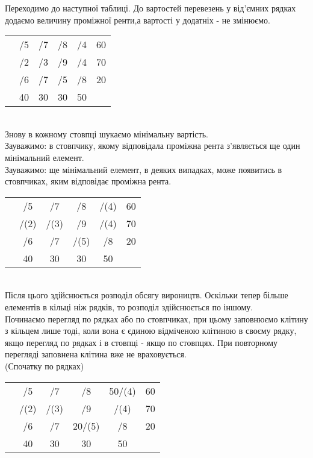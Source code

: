 \documentclass[12pt,a4paper]{book}
\begin{document}
Переходимо до наступної таблиці. До вартостей перевезень у від’ємних рядках додаємо величину проміжної ренти,а вартості у додатніх - не змінюємо.\\
\begin{tabular}{ | c | c | c | c | c | c | }
\hline
	&		&		&		&		&\\
\hline
	&	/5	&	/7	&	/8	&	/4	&	60\\
\hline
	&	/2	&	/3	&	/9	&	/4	&	70\\
\hline
	&	/6	&	/7	&	/5	&	/8	&	20\\
\hline
	&	40	&	30	&	30	&	50	&\\
\hline
\end{tabular}\\
Знову в кожному стовпці шукаємо мінімальну вартість.\\
Зауважимо: в стовпчику, якому відповідала проміжна рента з’являється ще один мінімальний елемент.\\
Зауважимо: ще мінімальний елемент, в деяких випадках, може появитись в стовпчиках, яким відповідає проміжна рента.\\
\begin{tabular}{ | c | c | c | c | c | c | }
\hline
	&		&		&		&		&\\
\hline
	&	/5	&	/7	&	/8	&	/(4)	&	60\\
\hline
	&	/(2)	&	/(3)	&	/9	&	/(4)	&	70\\
\hline
	&	/6	&	/7	&	/(5)	&	/8	&	20\\
\hline
	&	40	&	30	&	30	&	50	&\\
\hline
\end{tabular}\\
Після цього здійснюється розподіл обсягу вироництв. Оскільки тепер більше елементів в кільці ніж рядків, то розподіл здійснюється по іншому.\\
Починаємо перегляд по рядках або по стовпчиках, при цьому заповнюємо клітину з кільцем лише тоді, коли вона є єдиною відміченою клітиною в своєму рядку, якщо перегляд по рядках і в стовпці - якщо по стовпцях. При повторному перегляді заповнена клітина вже не враховується. \\
(Спочатку по рядках)
\begin{tabular}{ | c | c | c | c | c | c | }
\hline
	&		&		&		&		&\\
\hline
	&	/5	&	/7	&	/8	&	50/(4)	&	60\\
\hline
	&	/(2)	&	/(3)	&	/9	&	/(4)	&	70\\
\hline
	&	/6	&	/7	&	20/(5)	&	/8	&	20\\
\hline
	&	40	&	30	&	30	&	50	&\\
\hline
\end{tabular}\\
\end{document}
